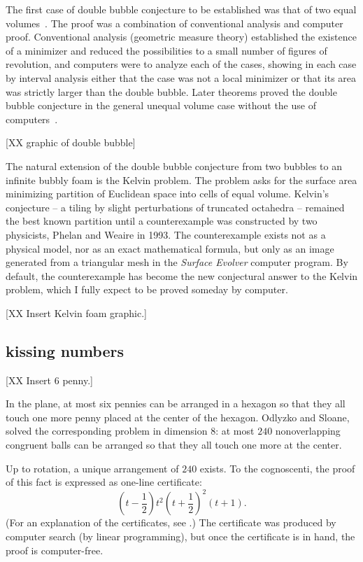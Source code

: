 \documentclass{llncs}
\begin{document}
The first case of double bubble conjecture to be established was that
of two equal volumes~\cite{HHS95}.  The proof was a combination of conventional
analysis and computer proof.  Conventional analysis (geometric measure
theory) established the existence of a minimizer and reduced the
possibilities to a small number of figures of revolution, and
computers were to analyze each of the cases, showing in each case by
interval analysis either that the case was not a local minimizer or
that its area was strictly larger than the double bubble.  Later
theorems proved the double bubble conjecture in the general unequal
volume case without the use of computers~\cite{HMRR}.

[XX graphic of double bubble]


The natural extension of the double bubble conjecture from two bubbles to an infinite
bubbly foam is the Kelvin problem.  The problem asks for the surface area minimizing
partition of Euclidean space into cells of equal volume.  Kelvin's conjecture --
a tiling by slight perturbations of truncated octahedra -- remained the best known partition
until a counterexample was constructed by two physicists, Phelan and Weaire in 1993.
The counterexample exists not as a physical model, nor as an exact mathematical formula, but
only as an image generated from a triangular mesh in the {\it Surface Evolver} computer
program.  By default, the counterexample has become the new conjectural answer to the
Kelvin problem, which  I fully expect to be proved someday by computer.

[XX Insert Kelvin foam graphic.]



\subsection{kissing numbers} %

[XX Insert 6 penny.]

In the plane, at most six pennies can be arranged in a hexagon so that they
all touch one more penny placed at the center of the hexagon.  Odlyzko
and Sloane, solved the corresponding problem in dimension $8$: at most
$240$ nonoverlapping congruent balls can be arranged so that they all
touch one more at the center.  

 Up to rotation, a unique arrangement of
$240$ exists.  To the cognoscenti, the proof of this fact is expressed as one-line certificate:
\[
(t - \frac{1}{2})t^2(t + \frac{1}{2})^2 (t + 1).
\]
(For an explanation of the certificates, see \cite{PZ}.)
The certificate was produced by computer search (by linear programming), but once
the certificate is in hand, the proof is computer-free.
\end{document}
